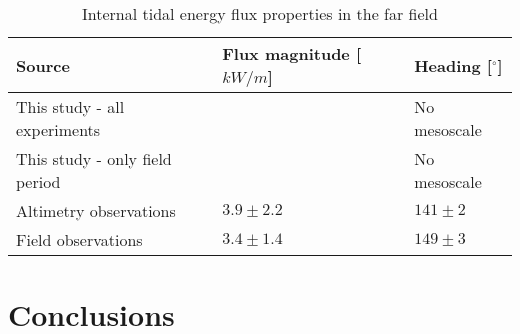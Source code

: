 \documentclass[12pt]{article}
\begin{document}
\begin{table}
	\caption{Internal tidal energy flux properties in the far field}
	\begin{tabular}{ |p{7cm}||p{4cm}|p{4cm}|  }
		\hline
		Source & Flux magnitude [$kW/m$] & Heading [$^\circ$] \\
		\hline
		This study - all experiments & ~ & No mesoscale \\
		This study - only field period & ~ & No mesoscale \\
		Altimetry observations \citep{zhao2018satellite} & $3.9 \pm 2.2$ & $141 \pm 2$ \\
		Field observations \citep{waterhouse2018observations} &   $3.4 \pm 1.4$ & $149 \pm 3$ \\
		\hline
	\end{tabular}
	\label{ch2:table_exp}
\end{table}
\section{Conclusions}

%
%
\end{document}
